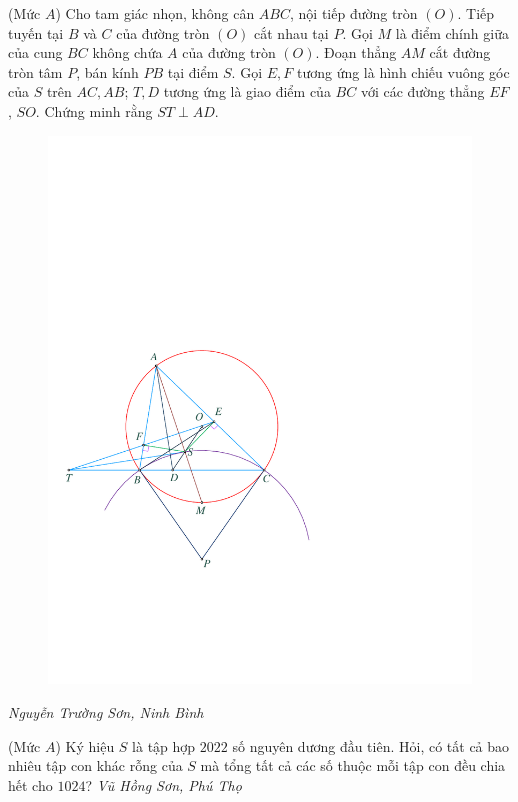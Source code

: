 \begin{multicols}{2}
\begin{flushright}
	\end{flushright}
	{}
	(Mức $A$) Cho tam giác nhọn, không cân $A B C$, nội tiếp đường tròn $(O)$. Tiếp tuyến tại $B$ và $C$ của đường tròn $(O)$ cắt nhau tại $P$. Gọi $M$ là điểm chính giữa của cung $B C$ không chứa $A$ của đường tròn $(O)$. Đoạn thẳng $A M$ cắt đường tròn tâm $P$, bán kính $P B$ tại điểm $S$. Gọi $E, F$ tương ứng là hình chiếu vuông góc của $S$ trên $A C, A B$; $T, D$ tương ứng là giao điểm của $B C$ với các đường thẳng $E F$, $SO$.  Chứng minh rằng $ST \perp A D$.
	\begin{figure}[H]
		\centering
		\vspace*{-5pt}
		\captionsetup{labelformat= empty, justification=centering}
		\includegraphics[width=0.85\linewidth]{P639}
		\vspace*{-10pt}
	\end{figure}
	\begin{flushright}
		\textit{Nguyễn Trường Sơn, Ninh Bình}
	\end{flushright}
	{}
	(Mức $A$) Ký hiệu $S$ là tập hợp $2022$ số nguyên dương đầu tiên. Hỏi, có tất cả bao nhiêu tập con khác rỗng của $S$ mà tổng tất cả các số thuộc mỗi tập con đều chia hết cho $1024$?
	\vskip 0.05cm
	\hfill	\textit{Vũ Hồng Sơn, Phú Thọ}
\end{multicols}
